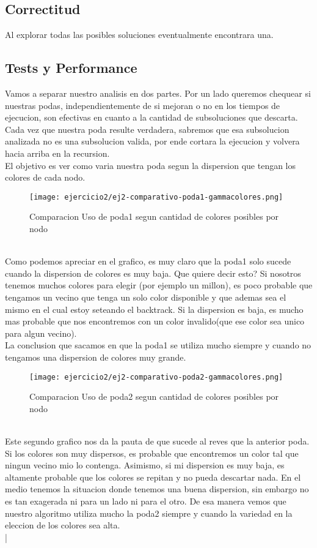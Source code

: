 \subsection{Correctitud}
Al explorar todas las posibles soluciones eventualmente encontrara una.

\subsection{Tests y Performance}
Vamos a separar nuestro analisis en dos partes. Por un lado queremos chequear si nuestras podas, independientemente de si mejoran o no en los tiempos de ejecucion, son efectivas en cuanto a la cantidad de subsoluciones que descarta. Cada vez que  nuestra poda resulte verdadera, sabremos que esa subsolucion analizada no es una subsolucion valida, por ende cortara la ejecucion y volvera hacia arriba en la recursion.  \\ 
El objetivo es ver como varia nuestra poda segun la dispersion que tengan los colores de cada nodo.\\ 
\begin{figure}[h!]
\texttt{[image: ejercicio2/ej2-comparativo-poda1-gammacolores.png]}
\centering
\caption{Comparacion Uso de poda1 segun cantidad de colores posibles por nodo}
\label{overflow3}
\end{figure}\\
\pagebreak
Como podemos apreciar en el grafico, es muy claro que la poda1 solo sucede cuando la dispersion de colores es muy baja. Que quiere decir esto? Si nosotros tenemos muchos colores para elegir (por ejemplo un millon), es poco probable que tengamos un vecino que tenga un solo color disponible y que ademas sea el mismo en el cual estoy seteando el backtrack. Si la dispersion es baja, es mucho mas probable que nos encontremos con un color invalido(que ese color sea unico para algun vecino).\\
La conclusion que sacamos en que la poda1 se utiliza mucho siempre y cuando no tengamos una dispersion de colores muy grande.\\


\begin{figure}[h!]
\texttt{[image: ejercicio2/ej2-comparativo-poda2-gammacolores.png]}
\centering
\caption{Comparacion Uso de poda2 segun cantidad de colores posibles por nodo}
\label{overflow3}
\end{figure}\\

Este segundo grafico nos da la pauta de que sucede al reves que la anterior poda. Si los colores son muy dispersos, es probable que encontremos un color tal que ningun vecino mio lo contenga. Asimismo, si mi dispersion es muy baja, es altamente probable que los colores se repitan y no pueda descartar nada. En el medio tenemos la situacion donde tenemos una buena dispersion, sin embargo no es tan exagerada ni para un lado ni para el otro. De esa manera vemos que nuestro algoritmo utiliza mucho la poda2 siempre y cuando la variedad en la eleccion de los colores sea alta.\\|\\


